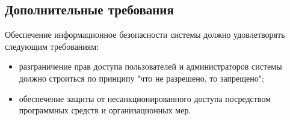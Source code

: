 \subsection{Дополнительные требования}


Обеспечение информационное безопасности системы должно удовлетворять следующим требованиям:
\begin{itemize}
\item разграничение прав доступа пользователей и администраторов системы должно строиться по принципу "что не разрешено, то запрещено";
\item обеспечение защиты от несанкционированного доступа посредством программных средств и организационных мер.
\end{itemize}
